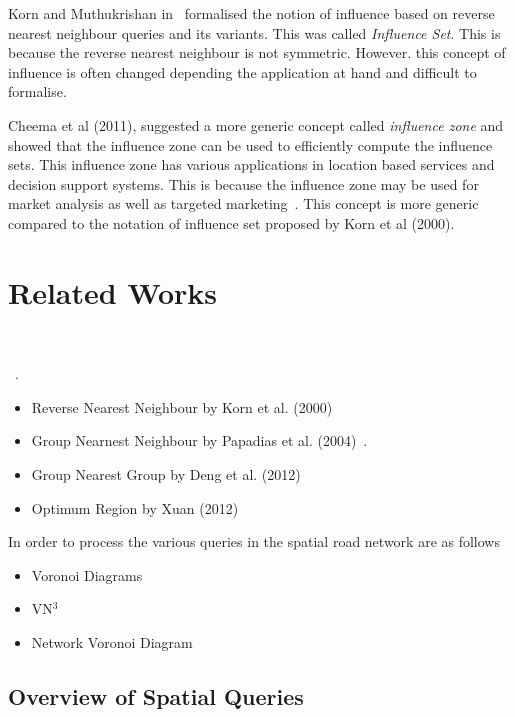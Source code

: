 \documentclass[a4paper,11pt]{article}
\begin{document}
Korn and Muthukrishan in~\cite{korn2000influence} formalised the notion of influence based on reverse nearest neighbour queries and its variants. This was called \textit{Influence Set}. This is because the reverse nearest neighbour is not symmetric. However. this concept of influence is often changed depending the application at hand and difficult to formalise. 

Cheema et al (2011), suggested a more generic concept called \textit{influence zone} and showed that the influence zone can be used to efficiently compute the influence sets. This influence zone has various applications in location based services and decision support systems. This is because the influence zone may be used for market analysis as well as targeted marketing~\cite{cheema2011influence}. This concept is more generic compared to the notation of influence set proposed by Korn et al (2000). 


\section{Related Works}

~\cite{guting1994introduction}

~\cite{berchtold1998fast}.

\begin{itemize}
	\item Reverse Nearest Neighbour by Korn et al. (2000)~\cite{korn2000influence}
	\item Group Nearnest Neighbour by Papadias et al. (2004)~\cite{papadias2004group}.
	\item Group Nearest Group by Deng et al. (2012)~\cite{deng2012group}
	\item Optimum Region by Xuan (2012)~\cite{Xuan2012}
\end{itemize}

In order to process the various queries in the spatial road network are as follows

\begin{itemize}
	\item Voronoi Diagrams 
	\item VN$^3$ ~\cite{kolahdouzan2004voronoi}
	\item Network Voronoi Diagram~\cite{xuan2009network}
\end{itemize}


\subsection{Overview of Spatial Queries}
\end{document}
